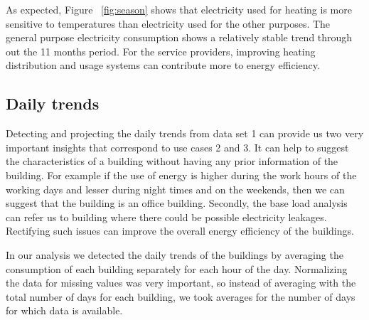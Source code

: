 As expected, Figure ~\ref{fig:season} shows that electricity used for heating is more sensitive to temperatures than electricity  used for the other purposes. The general purpose electricity consumption shows a relatively stable trend through out the 11 months period. For the service providers, improving heating distribution and usage systems can contribute more to energy efficiency. 

\subsection{Daily trends}
Detecting and projecting the daily trends from data set 1 can provide us two very important insights that correspond to use cases 2 and 3. It can help to suggest the characteristics of a building without having any prior information of the building. For example if the use of energy is higher during the work hours of the working days and lesser during night times and on the weekends, then we can suggest that the building is an office building. Secondly, the base load analysis can refer us to building where there could be possible electricity leakages. Rectifying such issues can improve the overall energy efficiency of the buildings.

In our analysis we detected the daily trends of the buildings by averaging the consumption of each building separately for each hour of the day. Normalizing the data for missing values was very important, so instead of averaging with the total number of days for each building, we took averages for the number of days for which data is available. 

